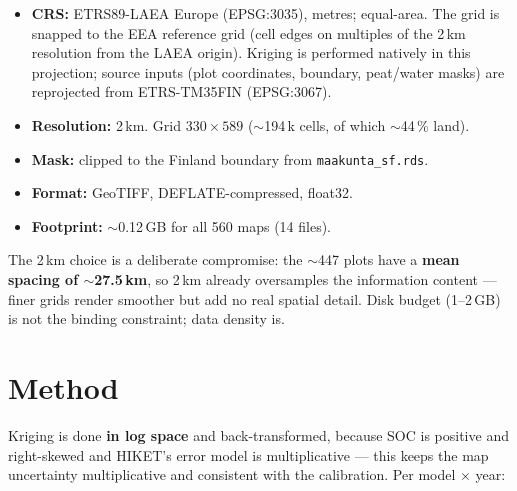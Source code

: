 \documentclass[11pt]{article}
\newcommand{\code}[1]{\texttt{\small #1}}
\begin{document}
\begin{itemize}
\item \textbf{CRS:} ETRS89-LAEA Europe (EPSG:3035), metres; equal-area. The grid is
snapped to the EEA reference grid (cell edges on multiples of the 2\,km resolution
from the LAEA origin). Kriging is performed natively in this projection; source
inputs (plot coordinates, boundary, peat/water masks) are reprojected from
ETRS-TM35FIN (EPSG:3067).
\item \textbf{Resolution:} 2\,km. Grid $330\times589$ ($\sim$194\,k cells, of which $\sim$44\,\% land).
\item \textbf{Mask:} clipped to the Finland boundary from \code{maakunta\_sf.rds}.
\item \textbf{Format:} GeoTIFF, DEFLATE-compressed, float32.
\item \textbf{Footprint:} $\sim$0.12\,GB for all 560 maps (14 files).
\end{itemize}

The 2\,km choice is a deliberate compromise: the $\sim$447 plots have a
\textbf{mean spacing of $\sim$27.5\,km}, so 2\,km already oversamples the
information content --- finer grids render smoother but add no real spatial
detail. Disk budget (1--2\,GB) is not the binding constraint; data density is.

\section{Method}

Kriging is done \textbf{in log space} and back-transformed, because SOC is
positive and right-skewed and HIKET's error model is multiplicative --- this
keeps the map uncertainty multiplicative and consistent with the calibration.
Per model $\times$ year:
\end{document}
